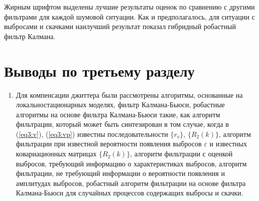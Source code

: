 Жирным шрифтом выделены лучшие результаты оценок по сравнению с другими фильтрами для каждой шумовой ситуации. Как и предполагалось, для ситуации с выбросами и скачками наилучший результат показал гибридный робастный фильтр Калмана.








\section{Выводы по третьему разделу} \label{sect:concl3}

\begin{enumerate}

 
 \item Для компенсации джиттера были рассмотрены алгоритмы, основанные на локальностационарных моделях, фильтр Калмана-Бьюси, робастные алгоритмы на основе фильтра Калмана-Бьюси такие, 
 как  алгоритм фильтрации, который может быть синтезирован в том случае, когда в (\ref{eq3:v}), (\ref{eq3:vp}) известны последовательности $\{r_v\}$, $\{R_2(k)\}$, 
 алгоритм фильтрации при известной вероятности появления выбросов $\varepsilon$ и известных ковариационных матрицах $\{R_2(k)\}$,
 алгоритм фильтрации с оценкой выбросов, требующий информацию о характеристиках выбросов,
 алгоритм фильтрации, не требующий информации о вероятности появления и амплитудах выбросов,
 робастный алгоритм фильтрации на основе фильтра Калмана-Бьюси для случайных процессов содержащих выбросы и скачки.
 

\end{enumerate}
